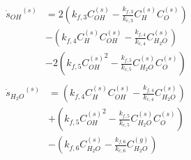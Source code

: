 \documentclass[a4paper]{report}
\newcommand{\sks}[1]{{\dot{s}_{#1}}^{(s)}}
\newcommand{\kf}[1]{k_{f,#1}}
\newcommand{\kcf}[1]{\frac{k_{f,#1}}{k_{c,#1}}}
\newcommand{\cg}[1]{C_{#1}^{(g)}}
\newcommand{\cs}[1]{C_{#1}^{(s)}}
\begin{document}
\begin{enumerate}
\begin{align}
    \begin{split}
      \sks{OH} &= 2 \left( \kf{3} \cs{OH} - \kcf{3} \cs{H} \cs{O} \right) \\
      &-\left( \kf{4} \cs{H} \cs{OH} - \kcf{4} \cs{H_2O} \right) \\
      &-2\left( \kf{5} {\cs{OH}}^2 - \kcf{5} \cs{H_2O} \cs{O} \right)
    \end{split} \\
    \begin{split}
      \sks{H_2O} &= \left( \kf{4} \cs{H} \cs{OH} - \kcf{4} \cs{H_2O} \right) \\
      &+\left( \kf{5} {\cs{OH}}^2 - \kcf{5} \cs{H_2O} \cs{O} \right) \\
      &-\left( \kf{6} \cs{H_2O} - \kcf{6} \cg{H_2O} \right)
    \end{split}
    \label{source terms}
  \end{align}


\end{enumerate}
\end{document}
